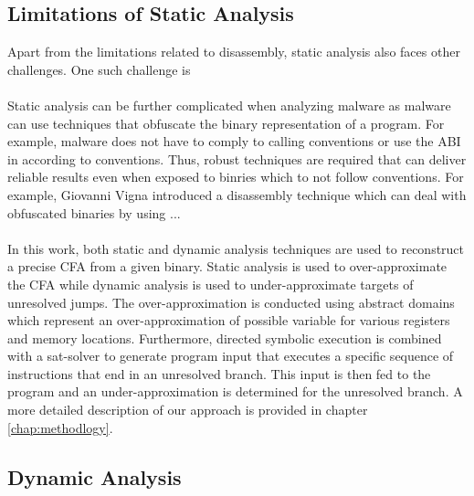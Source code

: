 \documentclass{kththesis}
\begin{document}
\subsection{Limitations of Static Analysis}
Apart from the limitations related to disassembly, static analysis also faces other challenges. One such challenge is 
\\ \\
Static analysis can be further complicated when analyzing malware as malware can use techniques that obfuscate the binary representation of a program\cite{StaticDisAndCodeAnal}. For example, malware does not have to comply to calling conventions or use the ABI in according to conventions. Thus, robust techniques are required that can deliver reliable results even when exposed to binries which to not follow conventions. For example, Giovanni Vigna introduced a disassembly technique which can deal with obfuscated binaries by using ..\cite{StaticDisAndCodeAnal}. 
\\ \\
In this work, both static and dynamic analysis techniques are used to reconstruct a precise CFA from a given binary. Static analysis is used to over-approximate the CFA while dynamic analysis is used to under-approximate targets of unresolved jumps. The over-approximation is conducted using abstract domains which represent an over-approximation of possible variable for various registers and memory locations. Furthermore, directed symbolic execution is combined with a sat-solver to generate program input that executes a specific sequence of instructions that end in an unresolved branch. This input is then fed to the program and an under-approximation is determined for the unresolved branch. A more detailed description of our approach is provided in chapter \ref{chap:methodlogy}.
\subsection{Dynamic Analysis}
\end{document}
